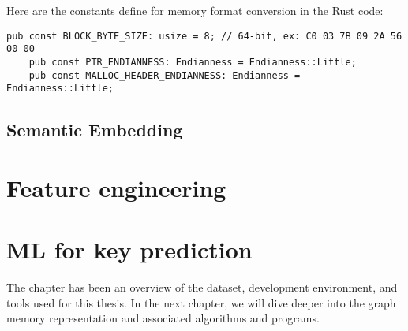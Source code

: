\begin{minipage}{\dimexpr\linewidth-20pt}
    Here are the constants define for memory format conversion in the Rust code:

   \begin{lstlisting}[style=rust, caption={Rust memory format constants in \textit{mem2graph}}]
    pub const BLOCK_BYTE_SIZE: usize = 8; // 64-bit, ex: C0 03 7B 09 2A 56 00 00
    pub const PTR_ENDIANNESS: Endianness = Endianness::Little;
    pub const MALLOC_HEADER_ENDIANNESS: Endianness = Endianness::Little;
   \end{lstlisting}
\end{minipage}

\subsection{Semantic Embedding}\label{sec:mem_2_graph:semantic_embedding}



\section{Feature engineering}

\section{ML for key prediction}

The chapter has been an overview of the dataset, development environment, and tools used for this thesis. In the next chapter, we will dive deeper into the graph memory representation and associated algorithms and programs.

